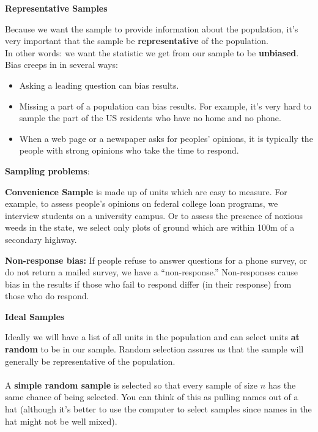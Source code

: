 \begin{center}
  {\bf Representative Samples}
\end{center}

Because we want the sample to provide information about the
population, it's very important that the sample be {\bf
  representative} of the population. \\
In other words: we want the statistic we get from our sample to be
{\bf unbiased}.  Bias creeps in in several ways:
\begin{itemize}
  \item Asking a leading question can bias results.  
  \item Missing a part of a population can bias results.  For example,
    it's very hard to sample the part of the US residents who have
    no home and no phone.
  \item When a web page or a newspaper asks for peoples' opinions, it
    is typically the people with strong opinions who take the time
    to respond. 
\end{itemize}

\begin{center}
  {\bf Sampling problems}:\vspace{-.5cm}
\end{center}
\begin{list}{}{}
\item [\bf Convenience Sample]  is made up of units which are easy to
  measure. For example, to assess people's opinions on federal college
  loan programs, we interview students on a university campus.  Or to
  assess the presence of noxious weeds in the state, we select only plots
  of ground which are within 100m of a secondary highway. 
\item [\bf Non-response bias:] If people refuse to answer questions
  for a phone survey, or do not return a mailed survey, we have a
  ``non-response.'' Non-responses cause bias in the results if those
  who fail to respond differ (in their response) from those who do
  respond. 
\end{list}

\begin{center}
  {\bf Ideal Samples}
\end{center}
 Ideally we will have a list of all units in the population and can
 select units {\bf at random} to be in our sample. 
Random selection assures us that the sample will generally be
representative of the population.\\ \\
 A {\bf simple random sample} is selected so that every sample of size
 $n$ has the same chance of being selected.  You can think of this as
 pulling names out of a hat (although it's better to use the computer
 to select samples since names in the hat might not be well mixed). 

